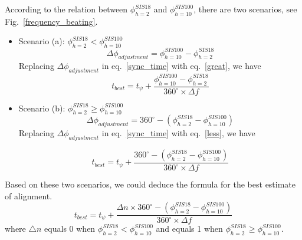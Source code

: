 According to the relation between $\phi_{h=2}^{SIS18}$ and $\phi_{h=10}^{SIS100}$, there are two scenarios, see Fig.~\ref{frequency_beating}.
\begin{itemize}
    \item Scenario (a): $\phi_{h=2}^{SIS18} < \phi_{h=10}^{SIS100}$
	\begin{equation}
	 \Delta \phi_{adjustment} = \phi_{h=10}^{SIS100} - \phi_{h=2}^{SIS18}\label {great}
   \end{equation}
   Replacing $\Delta \phi_{adjustment}$ in eq.~\ref{sync_time} with eq.~\ref{great}, we have
	\begin{equation}
	 t_{best} =t_{\psi} +\frac {\phi_{h=10}^{SIS100} - \phi_{h=2}^{SIS18}}{{360^\circ} \times {\Delta f}} \label {beating_win_1}
   \end{equation}
     \item  Scenario (b): $\phi_{h=2}^{SIS18} \ge \phi_{h=10}^{SIS100}$
	\begin{equation}
	 \Delta \phi_{adjustment} = 360^\circ - (\phi_{h=2}^{SIS18}-\phi_{h=10}^{SIS100}) \label {less}
   \end{equation}
  Replacing $\Delta \phi_{adjustment}$ in eq.~\ref{sync_time} with eq.~\ref{less}, we have

	\begin{equation}
	 t_{best} =t_{\psi} +\frac {360^\circ - (\phi_{h=2}^{SIS18}-\phi_{h=10}^{SIS100})}{{360^\circ} \times {\Delta f}} \label {beating_win_2}
   \end{equation}
\end{itemize}
Based on these two scenarios, we could deduce the formula for the best estimate of alignment. 
	\begin{equation}
	 t_{best} =t_{\psi} +\frac {{\Delta n} \times {360^\circ} - (\phi_{h=2}^{SIS18}-\phi_{h=10}^{SIS100})}{{360^\circ} \times {\Delta f}} \label {beating_win_2}
   \end{equation}
where $\bigtriangleup{n}$ equals 0 when  $\phi_{h=2}^{SIS18} < \phi_{h=10}^{SIS100}$ and equals 1 when  $\phi_{h=2}^{SIS18} \ge \phi_{h=10}^{SIS100}$.

